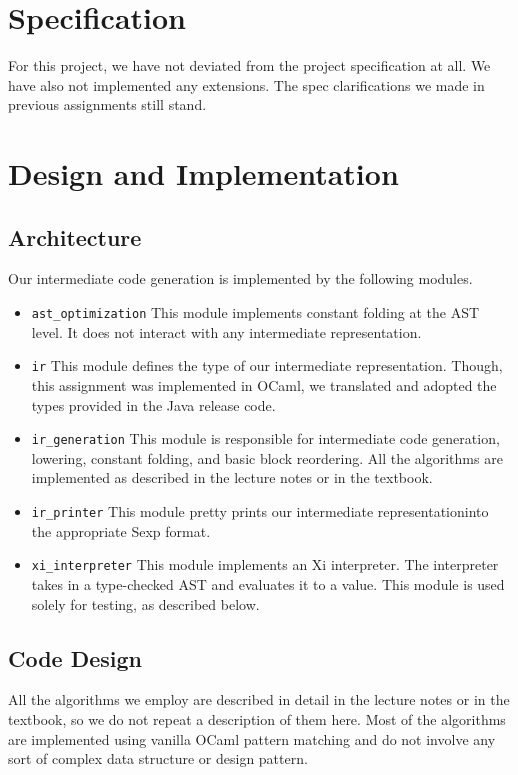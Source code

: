 \documentclass{hw}
\newcommand{\ir}{intermediate representation}
\begin{document}
\section{Specification}\label{sec:specification}
For this project, we have not deviated from the project specification at all.
We have also not implemented any extensions. The spec clarifications we made in
previous assignments still stand.

\section{Design and Implementation}\label{sec:design}
\subsection{Architecture}
Our intermediate code generation is implemented by the following modules.
\begin{itemize}
  \item \texttt{ast\_optimization}
    This module implements constant folding at the AST level. It does not
    interact with any \ir.

  \item \texttt{ir}
    This module defines the type of our \ir. Though, this assignment was
    implemented in OCaml, we translated and adopted the types provided in the
    Java release code.

  \item \texttt{ir\_generation}
    This module is responsible for intermediate code generation, lowering,
    constant folding, and basic block reordering. All the algorithms are
    implemented as described in the lecture notes or in the textbook.

  \item \texttt{ir\_printer}
    This module pretty prints our \ir into the appropriate Sexp format.

  \item \texttt{xi\_interpreter}
    This module implements an Xi interpreter. The interpreter takes in a
    type-checked AST and evaluates it to a value. This module is used solely
    for testing, as described below.
\end{itemize}

\subsection{Code Design}
All the algorithms we employ are described in detail in the lecture notes or in
the textbook, so we do not repeat a description of them here. Most of the
algorithms are implemented using vanilla OCaml pattern matching and do not
involve any sort of complex data structure or design pattern.
\end{document}
